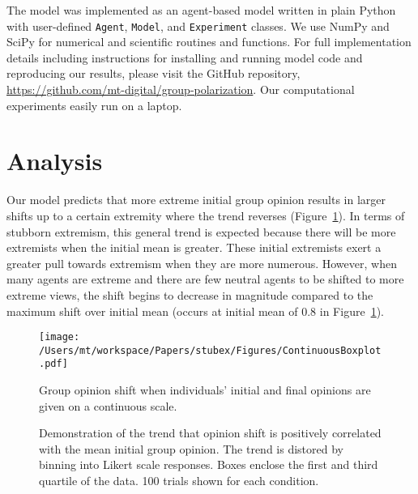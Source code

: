 The model was implemented as an agent-based model written in plain Python with 
user-defined \texttt{Agent}, \texttt{Model}, and \texttt{Experiment} classes.
We use NumPy and SciPy for numerical and scientific routines and functions.
For full implementation details including instructions for installing and
running model code and reproducing our results, please visit the GitHub
repository, \url{https://github.com/mt-digital/group-polarization}.
Our computational experiments easily run on a laptop. 


\section{Analysis}

Our model predicts that more extreme initial group opinion
results in larger shifts up to a certain extremity where the trend 
reverses (Figure~\ref{fig:shiftVsInitial}). 
In terms of stubborn extremism, this general trend is expected 
because there will be more extremists when the initial mean is greater. These
initial extremists exert a greater pull towards extremism when they are more
numerous. However, when many agents are extreme and there are few neutral agents
to be shifted to more extreme views, the shift begins to decrease in magnitude
compared to the maximum shift over initial mean 
(occurs at initial mean of 0.8 in Figure~\ref{fig:shiftVsInitial}).

\begin{figure}[t] %
  \centering
    \texttt{[image: /Users/mt/workspace/Papers/stubex/Figures/ContinuousBoxplot.pdf]}
    \caption{Group opinion shift when individuals' initial and final 
      opinions are given on a continuous scale.}
  \caption{Demonstration of the trend that opinion shift is positively
  correlated with the mean initial group opinion. The trend is distored
  by binning into Likert scale responses. 
  Boxes enclose the first and third quartile of the data. 100 trials shown
  for each condition.}
  \label{fig:shiftVsInitial}
\end{figure}

